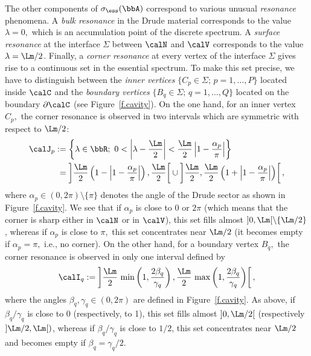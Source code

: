 The other components of $\sigma_{\ess}(\bbA)$ correspond to various unusual \emph{resonance} phenomena. A \emph{bulk resonance} in the Drude material corresponds to the value $\lambda = 0,$ which is an accumulation point of the discrete spectrum. A \emph{surface resonance} at the interface $\Sigma$ between $\calN$ and $\calV$ corresponds to the value $\lambda = \Lm/2$. Finally, a \emph{corner resonance} at every vertex of the interface $\Sigma$ gives rise to a continuous set in the essential spectrum. To make this set precise, we have to distinguish between the \emph{inner vertices} $\{ C_p \in \Sigma;\, p=1,\ldots,P \}$ located inside $\calC$ and the \emph{boundary vertices} $\{ B_q \in \Sigma;\, q=1,\ldots,Q \}$ located on the boundary $\partial\calC$ (see Figure~\ref{f.cavity}). On the one hand, for an inner vertex $C_p,$ the corner resonance is observed in two intervals which are symmetric with respect to $\Lm/2$:
\begin{align}
\calJ_p &:= \left\{ \lambda \in \bbR;\ 0 < \left|\lambda-\frac{\Lm}{2}\right| < \frac{\Lm}{2}\left|1-\frac{\alpha_p}{\pi}\right| \right\} \label{e.def-J_p}
\\
&\;= \left]
\frac{\Lm}{2}\left(1-\left|1-\frac{\alpha_p}{\pi}\right|\right),
\frac{\Lm}{2}
\right[
\cup
\left]
\frac{\Lm}{2},
\frac{\Lm}{2}\left(1+\left|1-\frac{\alpha_p}{\pi}\right|\right)
\right[, \nonumber
\end{align}
where $\alpha_p \in (0,2\pi)\setminus \{ \pi \}$ denotes the angle of the Drude sector as shown in Figure~\ref{f.cavity}. We see that if $\alpha_p$ is close to 0 or $2\pi$ (which means that the corner is sharp either in $\calN$ or in $\calV$), this set fills almost $]0,\Lm[\setminus \{\Lm/2\}$, whereas if $\alpha_p$ is close to $\pi,$ this set concentrates near $\Lm/2$ (it becomes empty if $\alpha_p = \pi,$ i.e., no corner). On the other hand, for a boundary vertex $B_q,$ the corner resonance is observed in only one interval defined by
\begin{equation}\label{e.def-I_q}
\calI_q := \left]
\frac{\Lm}{2}\, \min\left(1,\frac{2\beta_q}{\gamma_q} \right),
\frac{\Lm}{2}\, \max\left(1,\frac{2\beta_q}{\gamma_q} \right)
\right[,
\end{equation}
where the angles $\beta_q, \gamma_q \in (0,2\pi)$ are defined in Figure~\ref{f.cavity}. As above, if $\beta_q /\gamma_q$ is close to 0 (respectively, to 1), this set fills almost $]0,\Lm/2[$ (respectively $]\Lm/2,\Lm[)$, whereas if $\beta_q/\gamma_q$ is close to $1/2$, this set concentrates near $\Lm/2$ and becomes empty if $\beta_q = \gamma_q/2$.

